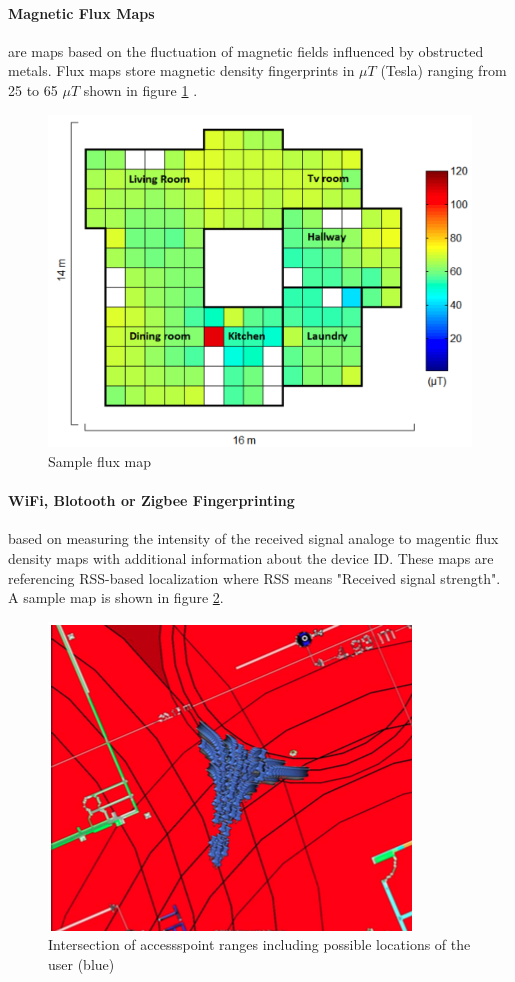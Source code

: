 \paragraph{Magnetic Flux Maps} are maps based on the fluctuation of magnetic fields influenced by obstructed metals. Flux maps store magnetic density fingerprints in $\mu T$ (Tesla) ranging from 25 to 65 $\mu T$ shown in figure \ref{fig:fluxMap} \parencite{fluxMap1}. 

\begin{figure}[h]
	\centering
		\includegraphics[width=.5\textwidth]{images/fluxMap.png}
	\caption{Sample flux map \parencite{fluxMap1}}
	\label{fig:fluxMap}
\end{figure}


\paragraph{WiFi, Blotooth or Zigbee Fingerprinting} based on measuring the intensity of the received signal analoge to magentic flux density maps with additional information about the device ID. These maps are referencing RSS-based localization where RSS means "Received signal strength". A sample map is shown in figure \ref{fig:intersection}. 

\begin{figure}[h]
	\centering
		\includegraphics[width=.5\textwidth]{images/rangeIntersection.png}
	\caption{Intersection of accessspoint ranges including possible locations of the user (blue)}
	\label{fig:intersection}
\end{figure}

